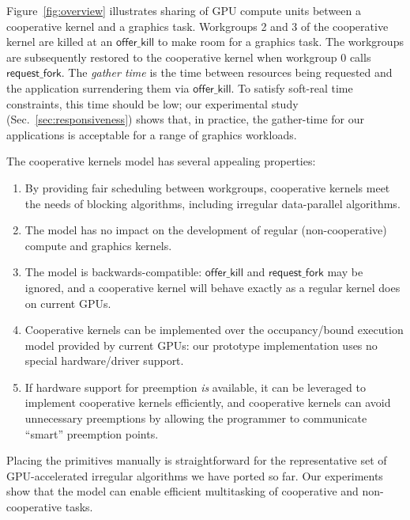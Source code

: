 \documentclass[sigconf]{acmart}
\newcommand{\myfiglong}{Figure~}
\newcommand{\mysec}{Sec.~}
\newcommand{\offerfork}{\mathsf{request\_fork}}
\newcommand{\offerkill}{\mathsf{offer\_kill}}
\begin{document}
\myfiglong{\ref{fig:overview}} illustrates sharing of GPU compute units between a cooperative kernel and a
graphics task. Workgroups 2 and 3 of the cooperative kernel
are killed at an $\offerkill$ to make room for a graphics
task. The workgroups are subsequently restored to the cooperative kernel when workgroup 0 calls $\offerfork$. The \emph{gather time} is the time
between resources being requested and the application surrendering them via $\offerkill$. To satisfy soft-real time
constraints, this time should be low; our experimental study
(\mysec{\ref{sec:responsiveness}}) shows that, in practice, the
gather-time for our applications is acceptable for a range of graphics
workloads.

The cooperative kernels model has several appealing
properties:

\begin{enumerate}[leftmargin=*]

\item By providing fair scheduling between workgroups, cooperative
  kernels meet the needs of blocking algorithms, including irregular
  data-parallel algorithms.

\item The model has no impact on the development of regular
  (non-cooperative) compute and graphics kernels.

\item The model is backwards-compatible: $\offerkill$ and $\offerfork$ may be ignored, and a cooperative kernel will behave
  exactly as a regular kernel does on current GPUs.

\item Cooperative kernels can be implemented over the occupancy\-/bound
  execution model provided by current GPUs: our prototype implementation uses no special hardware/driver support.

\item If hardware support for preemption \emph{is} available, it can be leveraged to implement cooperative kernels efficiently, and cooperative kernels can avoid unnecessary preemptions by allowing the programmer to communicate ``smart'' preemption points.

\end{enumerate}

Placing the primitives manually is straightforward for the representative set of
GPU-accelerated irregular algorithms we have ported so far.  Our experiments show that the model can enable efficient multitasking of cooperative and non-cooperative tasks.
\end{document}
